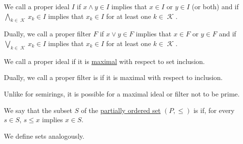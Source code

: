 \begin{definition}
\begin{thmenum}
    \begin{minipage}[t]{0.45\textwidth}
      We call a proper ideal \( I \)  if \( {x \wedge y \in I} \) implies that \( x \in I \) or \( y \in I \) (or both) and  if \( \bigwedge_{k \in \mscrK} x_k \in I \) implies that \( x_k \in I \) for at least one \( k \in \mscrK \).
    \end{minipage}
    \hspace{0.02\textwidth}
    \begin{minipage}[t]{0.45\textwidth}
      Dually, we call a proper filter \( F \)  if \( x \vee y \in F \) implies that \( x \in F \) or \( y \in F \) and  if \( \bigvee_{k \in \mscrK} x_k \in I \) implies that \( x_k \in I \) for at least one \( k \in \mscrK \).
    \end{minipage}

    \begin{minipage}[t]{0.45\textwidth}
      We call a proper ideal  if it is \hyperref[def:partially_ordered_set_extremal_points/maximal_and_minimal_element]{maximal} with respect to set inclusion.
    \end{minipage}
    \hspace{0.02\textwidth}
    \begin{minipage}[t]{0.45\textwidth}
      Dually, we call a proper filter is  if it is maximal with respect to inclusion.

      Unlike for semirings, it is possible for a maximal ideal or filter not to be prime.
    \end{minipage}
  \end{thmenum}
\end{definition}

\begin{definition}\label{def:closed_ordered_set}
  We say that the subset \( S \) of the \hyperref[def:partially_ordered_set]{partially ordered set} \( (P, \leq) \) is  if, for every \( s \in S \), \( s \leq x \) implies \( x \in S \).

  We define  sets analogously.
\end{definition}

